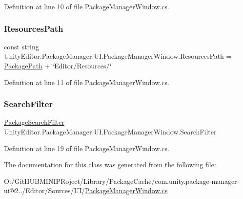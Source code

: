 Definition at line 10 of file Package\+Manager\+Window.\+cs.

\mbox{\label{class_unity_editor_1_1_package_manager_1_1_u_i_1_1_package_manager_window_ac6bc78a741c9ab19ceeb2fa9a51cf645}} 
\subsubsection{\texorpdfstring{ResourcesPath}{ResourcesPath}}
{\footnotesize\ttfamily const string Unity\+Editor.\+Package\+Manager.\+U\+I.\+Package\+Manager\+Window.\+Resources\+Path = \mbox{\hyperlink{class_unity_editor_1_1_package_manager_1_1_u_i_1_1_package_manager_window_a573491faa7f680cb7df43324558673b1}{Package\+Path}} + \char`\"{}Editor/Resources/\char`\"{}}



Definition at line 11 of file Package\+Manager\+Window.\+cs.

\mbox{\label{class_unity_editor_1_1_package_manager_1_1_u_i_1_1_package_manager_window_a932456f8d3483ff455636f21e2fc82d7}} 
\subsubsection{\texorpdfstring{SearchFilter}{SearchFilter}}
{\footnotesize\ttfamily \mbox{\hyperlink{class_unity_editor_1_1_package_manager_1_1_u_i_1_1_package_search_filter}{Package\+Search\+Filter}} Unity\+Editor.\+Package\+Manager.\+U\+I.\+Package\+Manager\+Window.\+Search\+Filter}



Definition at line 19 of file Package\+Manager\+Window.\+cs.



The documentation for this class was generated from the following file\+:\begin{DoxyCompactItemize}
\item 
O\+:/\+Git\+H\+U\+B\+M\+I\+N\+I\+P\+Roject/\+Library/\+Package\+Cache/com.\+unity.\+package-\/manager-\/ui@2../\+Editor/\+Sources/\+U\+I/\mbox{\hyperlink{_package_manager_window_8cs}{Package\+Manager\+Window.\+cs}}\end{DoxyCompactItemize}
